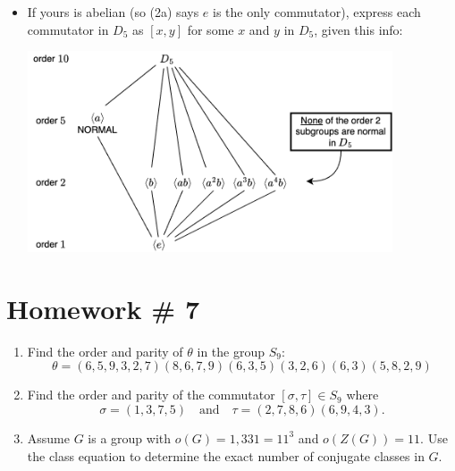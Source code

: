 \begin{enumerate}
\begin{itemize}
        \item If yours is abelian (so (2a) says \( e \) is the only commutator), express each commutator in \( D_5 \) as \( [x,y] \) for some \( x \) and \( y \) in \( D_5 \), given this info:
        \begin{center}
            \includegraphics[width=0.85\textwidth]{Figures/HW6_Subgroup_Lattice.png}
        \end{center}
    \end{itemize}

\end{enumerate}

\newpage 



\section*{Homework \# 7}
\label{sec:HW7}

\begin{enumerate}
    \item Find the order and parity of \( \theta \) in the group \( S_9 \):
    \[
    \theta = (6,5,9,3,2,7)(8,6,7,9)(6,3,5)(3,2,6)(6,3)(5,8,2,9)
    \]

    \item Find the order and parity of the commutator \( [\sigma, \tau] \in S_9 \) where 
    \[
    \sigma = (1,3,7,5) \quad \text{and} \quad \tau = (2,7,8,6)(6,9,4,3).
    \]

    \item Assume \( G \) is a group with \( o(G) = 1,331 = 11^3 \) and \( o(Z(G)) = 11 \).  
    Use the class equation to determine the exact number of conjugate classes in \( G \). \\ \steezybreak

\end{enumerate}

